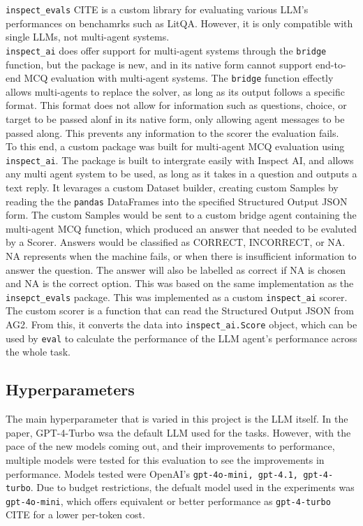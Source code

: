\texttt{inspect\_evals} CITE is a custom library for evaluating various LLM's performances on benchamrks such as LitQA. However, it is only compatible with single LLMs, not multi-agent systems. \\

\texttt{inspect\_ai} does offer support for multi-agent systems through the \texttt{bridge} function, but the package is new, and in its native form cannot support end-to-end MCQ evaluation with multi-agent systems. The \texttt{bridge} function effectly allows multi-agents to replace the solver, as long as its output follows a specific format.
This format does not allow for information such as questions, choice, or target to be passed alonf in its native form, only allowing agent messages to be passed along. 
This prevents any information to the scorer the evaluation fails. \\

To this end, a custom package was built for multi-agent MCQ evaluation using \texttt{inspect\_ai}. The package is built to intergrate easily with Inspect AI, and allows any multi agent system to be used, as long as it takes in a question and outputs a text reply. 
It levarages a custom Dataset builder, creating custom Samples by reading the the \texttt{pandas} DataFrames into the specified Structured Output JSON form. The custom Samples would be sent to a custom bridge agent containing the multi-agent MCQ function, which produced an answer that needed to be evaluted by a Scorer. Answers would be classified as CORRECT, INCORRECT, or NA. NA represents when the machine fails, or when there is insufficient information to answer the question. The answer will also be labelled as correct if NA is chosen and NA is the correct option. This was based on the same implementation as the \texttt{insepct\_evals} package. This was implemented as a custom \texttt{inspect\_ai} scorer. The custom scorer is a function that can read the Structured Output JSON from AG2. From this, it converts the data into \texttt{inspect\_ai.Score} object, which can be used by \texttt{eval} to calculate the performance of the LLM agent's performance across the whole task. \\

\subsection{Hyperparameters}

The main hyperparameter that is varied in this project is the LLM itself. In the paper, GPT-4-Turbo wsa the default LLM used for the tasks. However, with the pace of the new models coming out, and their improvements to performance, multiple models were tested for this evaluation to see the improvements in performance. Models tested were OpenAI's \texttt{gpt-4o-mini, gpt-4.1, gpt-4-turbo}. Due to budget restrictions, the defualt model used in the experiments was \texttt{gpt-4o-mini}, which offers equivalent or better performance as \texttt{gpt-4-turbo} CITE for a lower per-token cost. \\

